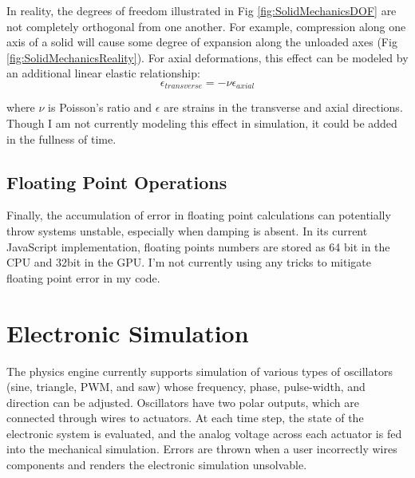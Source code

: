 {In reality, the degrees of freedom illustrated in Fig \ref{fig:SolidMechanicsDOF} are not completely orthogonal from one another.  For example, compression along one axis of a solid will cause some degree of expansion along the unloaded axes (Fig \ref{fig:SolidMechanicsReality}).  For axial deformations, this effect can be modeled by an additional linear elastic relationship:
\[ \epsilon_{transverse} = -\nu \epsilon_{axial}\]

where $\nu$ is Poisson's ratio and $\epsilon$ are strains in the transverse and axial directions.\\

Though I am not currently modeling this effect in simulation, it could be added in the fullness of time.

%

\subsection{Floating Point Operations}

Finally, the accumulation of error in floating point calculations can potentially throw systems unstable, especially when damping is absent.  In its current JavaScript implementation, floating points numbers are stored as 64 bit in the CPU and 32bit in the GPU.  I'm not currently using any tricks to mitigate floating point error in my code.

\section{Electronic Simulation}\label{sec:electronicSim}

The physics engine currently supports simulation of various types of oscillators (sine, triangle, PWM, and saw) whose frequency, phase, pulse-width, and direction can be adjusted.  Oscillators have two polar outputs, which are connected through wires to actuators.  At each time step, the state of the electronic system is evaluated, and the analog voltage across each actuator is fed into the mechanical simulation.  Errors are thrown when a user incorrectly wires components and renders the electronic simulation unsolvable.\\

}
